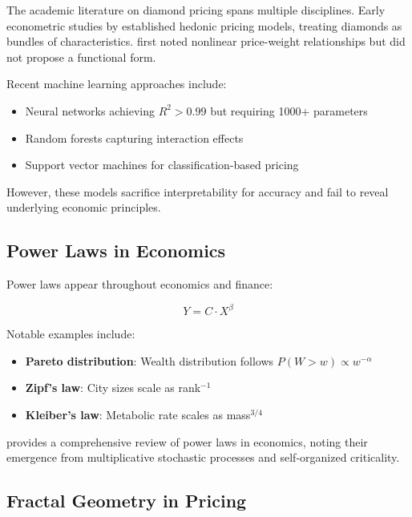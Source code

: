 \documentclass[12pt,a4paper]{article}
\begin{document}
The academic literature on diamond pricing spans multiple disciplines. Early econometric studies by \citet{rosen1974} established hedonic pricing models, treating diamonds as bundles of characteristics. \citet{scott1970} first noted nonlinear price-weight relationships but did not propose a functional form.

Recent machine learning approaches include:
\begin{itemize}
    \item Neural networks achieving $R^2 > 0.99$ but requiring 1000+ parameters \citep{lee2021}
    \item Random forests capturing interaction effects \citep{kumar2019}
    \item Support vector machines for classification-based pricing \citep{chen2020}
\end{itemize}

However, these models sacrifice interpretability for accuracy and fail to reveal underlying economic principles.

\subsection{Power Laws in Economics}

Power laws appear throughout economics and finance:

\begin{equation}
Y = C \cdot X^{\beta}
\end{equation}

Notable examples include:
\begin{itemize}
    \item \textbf{Pareto distribution}: Wealth distribution follows $P(W > w) \propto w^{-\alpha}$ \citep{pareto1896}
    \item \textbf{Zipf's law}: City sizes scale as rank$^{-1}$ \citep{zipf1949}
    \item \textbf{Kleiber's law}: Metabolic rate scales as mass$^{3/4}$ \citep{kleiber1932}
\end{itemize}

\citet{gabaix2009} provides a comprehensive review of power laws in economics, noting their emergence from multiplicative stochastic processes and self-organized criticality.

\subsection{Fractal Geometry in Pricing}
\end{document}
